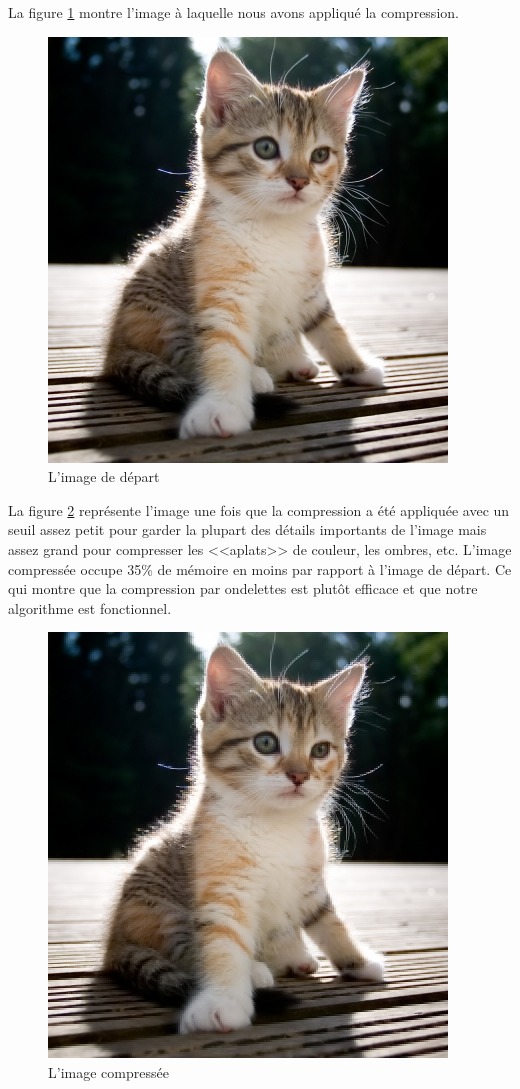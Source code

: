 \documentclass{article}
\begin{document}
La figure \ref{chat1} montre l'image à laquelle nous avons appliqué la compression.

\begin{figure}[!hb]
\centering
\includegraphics[scale=2]{chat.jpg}
\caption{L'image de départ}
\label{chat1}
\end{figure}




La figure \ref{chat2} représente l'image une fois que la compression a été appliquée avec un seuil assez petit pour garder la plupart des détails importants de l'image mais assez grand pour compresser les <<aplats>> de couleur, les ombres, etc. L'image compressée occupe 35\% de mémoire en moins par rapport à l'image de départ. Ce qui montre que la compression par ondelettes est plutôt efficace et que notre algorithme est fonctionnel.

\begin{figure}[!ht]
\centering
\includegraphics[scale=0.8]{chat_compress.jpg}
\caption{L'image compressée}
\label{chat2}
\end{figure}
\end{document}
